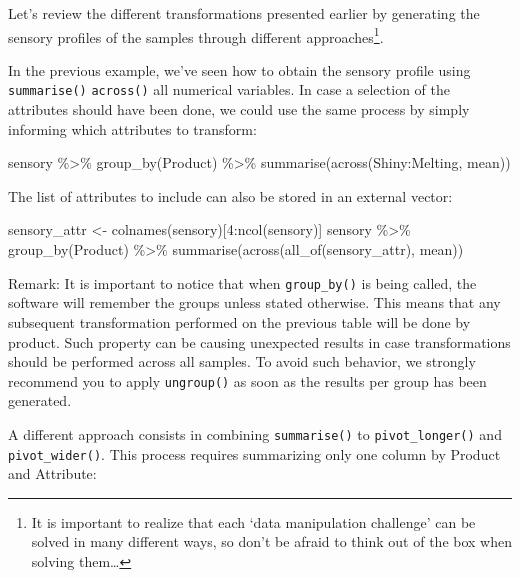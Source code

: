 \documentclass[
]{book}
\newenvironment{Shaded}{\begin{snugshade}}{\end{snugshade}}
\newcommand{\DecValTok}[1]{\textcolor[rgb]{0.00,0.00,0.81}{#1}}
\newcommand{\FunctionTok}[1]{\textcolor[rgb]{0.00,0.00,0.00}{#1}}
\newcommand{\NormalTok}[1]{#1}
\newcommand{\OtherTok}[1]{\textcolor[rgb]{0.56,0.35,0.01}{#1}}
\newcommand{\SpecialCharTok}[1]{\textcolor[rgb]{0.00,0.00,0.00}{#1}}
\begin{document}
Let's review the different transformations presented earlier by generating the sensory profiles of the samples through different approaches\footnote{It is important to realize that each `data manipulation challenge' can be solved in many different ways, so don't be afraid to think out of the box when solving them\ldots{}}.

In the previous example, we've seen how to obtain the sensory profile using \texttt{summarise()} \texttt{across()} all numerical variables. In case a selection of the attributes should have been done, we could use the same process by simply informing which attributes to transform:

\begin{Shaded}
\begin{Highlighting}[]
\NormalTok{sensory }\SpecialCharTok{\%\textgreater{}\%} 
  \FunctionTok{group\_by}\NormalTok{(Product) }\SpecialCharTok{\%\textgreater{}\%} 
  \FunctionTok{summarise}\NormalTok{(}\FunctionTok{across}\NormalTok{(Shiny}\SpecialCharTok{:}\NormalTok{Melting, mean))}
\end{Highlighting}
\end{Shaded}

The list of attributes to include can also be stored in an external vector:

\begin{Shaded}
\begin{Highlighting}[]
\NormalTok{sensory\_attr }\OtherTok{\textless{}{-}} \FunctionTok{colnames}\NormalTok{(sensory)[}\DecValTok{4}\SpecialCharTok{:}\FunctionTok{ncol}\NormalTok{(sensory)]}
\NormalTok{sensory }\SpecialCharTok{\%\textgreater{}\%} 
  \FunctionTok{group\_by}\NormalTok{(Product) }\SpecialCharTok{\%\textgreater{}\%} 
  \FunctionTok{summarise}\NormalTok{(}\FunctionTok{across}\NormalTok{(}\FunctionTok{all\_of}\NormalTok{(sensory\_attr), mean))}
\end{Highlighting}
\end{Shaded}

Remark: It is important to notice that when \texttt{group\_by()} is being called, the software will remember the groups unless stated otherwise. This means that any subsequent transformation performed on the previous table will be done by product. Such property can be causing unexpected results in case transformations should be performed across all samples. To avoid such behavior, we strongly recommend you to apply \texttt{ungroup()} as soon as the results per group has been generated.

A different approach consists in combining \texttt{summarise()} to \texttt{pivot\_longer()} and \texttt{pivot\_wider()}. This process requires summarizing only one column by Product and Attribute:
\end{document}
